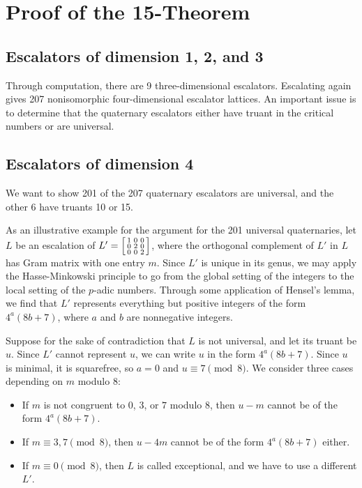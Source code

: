\documentclass[letterpaper, 12pt]{article}
\begin{document}
\section{Proof of the 15-Theorem}
\subsection{Escalators of dimension 1, 2, and 3}
Through computation, there are 9 three-dimensional escalators.
Escalating again gives 207 nonisomorphic four-dimensional escalator lattices. An important issue is to determine that the quaternary escalators either have truant in the critical numbers or are universal.

\subsection{Escalators of dimension 4}
We want to show 201 of the 207 quaternary escalators are universal, and the other 6 have truants 10 or 15.

As an illustrative example for the argument for the 201 universal quaternaries, let $L$ be an escalation of $L' = \begin{bsmallmatrix} 1 & 0 & 0 \\ 0 & 2 & 0 \\ 0 & 0 & 2 \end{bsmallmatrix}$, where the orthogonal complement of $L'$ in $L$ has Gram matrix with one entry $m$. Since $L'$ is unique in its genus, we may apply the Hasse-Minkowski principle to go from the global setting of the integers to the local setting of the $p$-adic numbers. Through some application of Hensel's lemma, we find that $L'$ represents everything but positive integers of the form $4^a (8b + 7)$, where $a$ and $b$ are nonnegative integers.

Suppose for the sake of contradiction that $L$ is not universal, and let its truant be $u$. Since $L'$ cannot represent $u$, we can write $u$ in the form $4^a (8b + 7)$. Since $u$ is minimal, it is squarefree, so $a = 0$ and $u \equiv 7 \pmod 8$. We consider three cases depending on $m$ modulo $8$:
\begin{itemize}
    \item If $m$ is not congruent to $0$, $3$, or $7$ modulo $8$, then $u-m$ cannot be of the form $4^a (8b + 7)$.
    \item If $m \equiv 3, 7 \pmod 8$, then $u-4m$ cannot be of the form $4^a (8b + 7)$ either.
    \item If $m \equiv 0 \pmod 8$, then $L$ is called exceptional, and we have to use a different $L'$.
\end{itemize}
\end{document}
